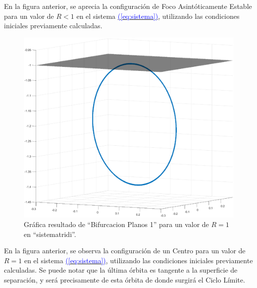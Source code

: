 \documentclass[12pt,a4paper]{report} %
\newcommand{\eref}[1]{\hyperref[#1]{\textcolor{blue}{(\ref*{#1})}}}
\newcommand{\eref}[1]{\hyperref[#1]{\textcolor{blue}{\textit{(\ref*{#1})}}}}
\begin{document}
	\vspace{0.5cm}\noindent En la figura anterior, se aprecia la configuración de Foco Asintóticamente Estable para un valor de $R<1$ en el sistema \eref{eq:sistema}, utilizando las condiciones iniciales previamente calculadas.
	
	\newpage
	
	\begin{figure}[h]
		\centering
		\includegraphics[width=1\textwidth]{centrocir.eps}
		\caption{Gráfica resultado de ``Bifurcacion Planos 1'' para un valor de $R=1$ en ``sistematridi''.}
		\label{fig:centrocircuito}
	\end{figure}\smallskip
	
		\vspace{0.5cm}\noindent En la figura anterior, se observa la configuración de un Centro para un valor de $R=1$ en el sistema \eref{eq:sistema}, utilizando las condiciones iniciales previamente calculadas. Se puede notar que la última órbita es tangente a la superficie de separación, y será precisamente de esta órbita de donde surgirá el Ciclo Límite.
	
	\newpage
	
\end{document}
